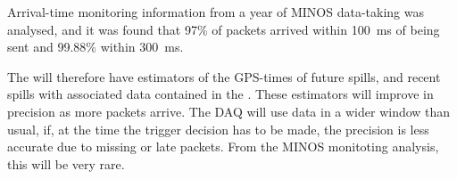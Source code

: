 Arrival-time monitoring information from a year of MINOS data-taking
was analysed, and it was found that 97\% of packets arrived within
\SI{100}{\ms} of being sent and 99.88\% within \SI{300}{\ms}.

The  will therefore have estimators of the GPS-times of
future spills, and recent spills with associated data contained in the
. These estimators will improve in precision as
more packets arrive.  The DAQ will use data in a wider window than
usual, if, at the time the trigger decision has to be made, the
precision is less accurate due to missing or late packets.  From the
MINOS monitoting analysis, this will be very rare.

